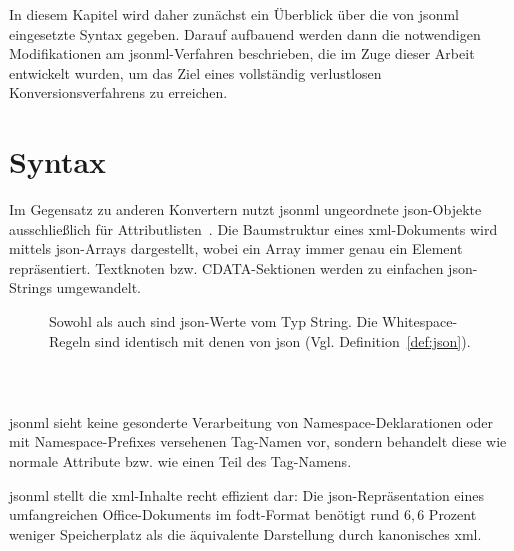 In diesem Kapitel wird daher zunächst ein Überblick über die von \acrshort{jsonml} eingesetzte Syntax gegeben.
Darauf aufbauend werden dann die notwendigen Modifikationen am \acrshort{jsonml}-Verfahren beschrieben, die im Zuge dieser Arbeit entwickelt wurden, um das Ziel eines vollständig verlustlosen Konversionsverfahrens zu erreichen.

\section{Syntax}

Im Gegensatz zu anderen Konvertern nutzt \acrshort{jsonml} ungeordnete \acrshort{json}-Objekte ausschließlich für Attributlisten~\cite{jsonmlsyntax}. Die Baumstruktur eines \acrshort{xml}-Dokuments wird mittels \acrshort{json}-Arrays dargestellt, wobei ein Array immer genau ein Element repräsentiert. Textknoten bzw. CDATA-Sektionen werden zu einfachen \acrshort{json}-Strings umgewandelt.

\begin{figure}[H]
    \begin{definition}
        \label{def:jsonml}
        Sowohl  als auch  sind \acrshort{json}-Werte vom Typ String. Die Whitespace-Regeln sind identisch mit denen von \acrshort{json} (Vgl. Definition~\ref{def:json}).
        \begin{grammar}
            
        \end{grammar}
    \end{definition}
\end{figure}

\begin{figure}[h]
    \begin{example}~
    \inputminted{json}{xmltree.json}
    \label{fig:xmltreejsonml}
    \end{example}
\end{figure}

\acrshort{jsonml} sieht keine gesonderte Verarbeitung von Namespace-Deklarationen oder mit Namespace-Prefixes versehenen Tag-Namen vor, sondern behandelt diese wie normale Attribute bzw. wie einen Teil des Tag-Namens.

\acrshort{jsonml} stellt die \acrshort{xml}-Inhalte recht effizient dar: Die \acrshort{json}-Repräsentation eines umfangreichen Office-Dokuments im \acrshort{fodt}-Format benötigt rund $6,6$ Prozent weniger Speicherplatz als die äquivalente Darstellung durch kanonisches \acrshort{xml}.

